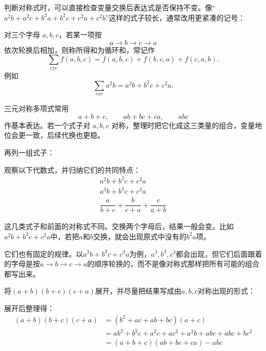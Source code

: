 判断对称式时，可以直接检查变量交换后表达式是否保持不变。像“$a^2b + a^2c + b^2a + b^2c + c^2a + c^2b$”这样的式子较长，通常改用更紧凑的记号：
\begin{definition}[循环和]
    对三个字母 $a,b,c$，若某一项按
    \[
    a\to b\to c\to a
    \]
    依次轮换后相加，则称所得和为循环和，常记作
    \[
    \sum_{\mathrm{cyc}} f(a,b,c)=f(a,b,c)+f(b,c,a)+f(c,a,b).
    \]
    例如
    \[
    \sum_{\mathrm{cyc}}a^2b=a^2b+b^2c+c^2a.
    \]
\end{definition}

\begin{property}[对称式的性质]
    三元对称多项式常用
    \[
    a+b+c,\qquad ab+bc+ca,\qquad abc
    \]
    作基本表达。若一个式子对 $a,b,c$ 对称，整理时把它化成这三类量的组合，变量地位会更一致，后续代换也更稳。
\end{property}

再列一组式子：
\begin{example}
    观察以下代数式，并归纳它们的共同特点：\vspace{-10pt}
    \begin{gather*}
        a^2b+b^2c+c^2a\\
        a^3b+b^3c+c^3a\\
        \dfrac{a}{b+c}+\dfrac{b}{c+a}+\dfrac{c}{a+b}
    \end{gather*}
\end{example}
\begin{solution}
    这几类式子和前面的对称式不同。交换两个字母后，结果一般会变。比如$a^2b+b^2c+c^2a$中，若把$a$和$b$交换，就会出现原式中没有的$b^2a$项。

    它们也有固定的规律。以$a^3b+b^3c+c^3a$为例，$a^3,b^3,c^3$都会出现，但它们后面跟着的字母是按$a\to b\to c\to a$的顺序轮换的，而不是像对称式那样把所有可能的组合都写出来。
\end{solution}
\begin{example}
    将$(a+b)(b+c)(c+a)$展开，并尽量把结果写成由$a,b,c$对称出现的形式：
\end{example}
\begin{solution}
    展开后整理得：\vspace{-10pt}
    \begin{align*}
    (a+b)(b+c)(c+a)&=(b^2+ac+ab+bc)(a+c)\\
    &=ab^2+b^2c+a^2c+ac^2+a^2b+abc+abc+bc^2\\
    &=(a+b+c)(ab+bc+ca)-abc
    \end{align*}
\end{solution}

